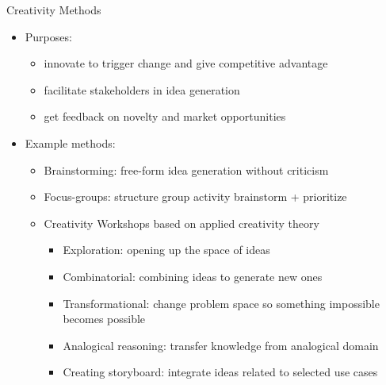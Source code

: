 \begin{Slide}{Creativity Methods}
\begin{itemize}
\item Purposes: 
\begin{itemize}
\item innovate to trigger change and give competitive advantage
\item facilitate stakeholders in idea generation 
\item get feedback on novelty and market opportunities
\end{itemize}
\item Example methods:
\begin{itemize}
\item Brainstorming: free-form idea generation without criticism
\item Focus-groups: structure group activity brainstorm + prioritize
\item Creativity Workshops based on applied creativity theory
\begin{itemize}
\item Exploration: opening up the space of ideas
\item Combinatorial: combining ideas to generate new ones
\item Transformational: change problem space so something impossible becomes possible
\item Analogical reasoning: transfer knowledge from analogical domain
\item Creating storyboard: integrate ideas related to selected use cases

\end{itemize}
\end{itemize}
\end{itemize}
\end{Slide}
